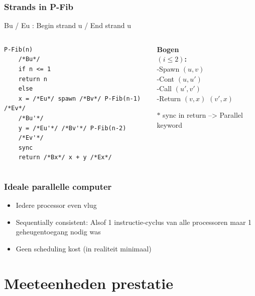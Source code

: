 \documentclass
   [kulak] %
   {kulakbeamer}
\begin{document}
\begin{frame}[fragile]
	\frametitle{Strands in P-Fib}
	Bu / Eu : Begin strand u / End strand u
	\begin{columns}[T]
		\begin{column}{.8\textwidth}
			
		
	
	
	\begin{lstlisting}[style=CStyle]
	P-Fib(n) 
	/*Bu*/
	if n <= 1
	return n
	else 
	x = /*Eu*/ spawn /*Bv*/ P-Fib(n-1) /*Ev*/
	/*Bu'*/
	y = /*Eu'*/ /*Bv'*/ P-Fib(n-2)
	/*Ev'*/
	sync
	return /*Bx*/ x + y /*Ex*/\end{lstlisting}
	
\end{column}

\begin{column}{.2\textwidth}
	\pause
	\textbf{Bogen\\ $(i \leqslant 2)$:}
	\\ \pause
	-Spawn $(u,v)$
	\\ \pause
	-Cont $(u,u')$
	\\ \pause
	-Call $(u',v')$
	\\ \pause
	-Return $(v,x)$ $(v',x)$
	
	
	\pause
	
	$\ast$  sync in return --> Parallel keyword
\end{column}

\end{columns}
	
\end{frame}



\begin{frame}
	\frametitle{Ideale parallelle computer}
	\pause
	\begin{itemize}
		
		\item Iedere processor even vlug
		
		\pause
		
		\item Sequentially consistent: Alsof 1 instructie-cyclus van alle processoren maar 1 geheugentoegang nodig was
		
		\pause
		
		\item Geen scheduling kost (in realiteit minimaal)
	\end{itemize}
	
\end{frame}

\section[Meeteenheden]{Meeteenheden prestatie}
\end{document}
